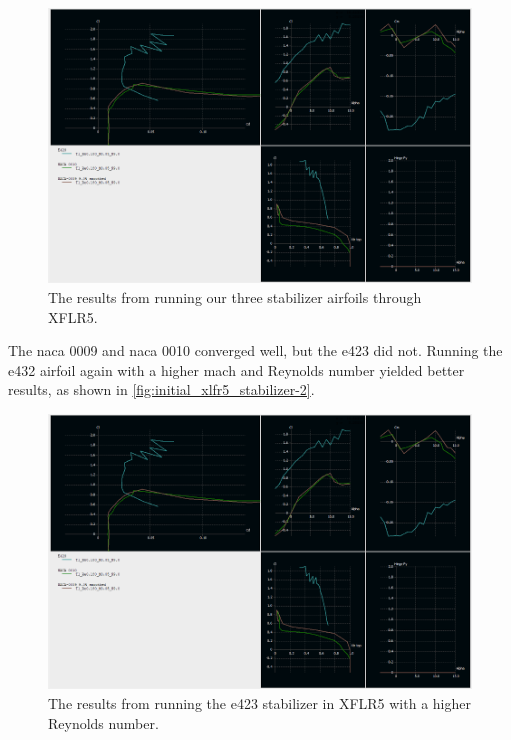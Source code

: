\begin{figure}[htpb]
    \centering
    \includegraphics[width=\linewidth]{Figures/stabilizer_initial_xlfr5-1.png}
    \caption[Initial stabilizer XLFR5 analysis results]{The results from running our three stabilizer airfoils through XFLR5.}
    \label{fig:initial_xlfr5_stabilizer-1}
\end{figure}

The \acrshort{naca} 0009 and \acrshort{naca} 0010 converged well, but the \acrshort{e}423 did not. Running the \acrshort{e}432 airfoil again with a higher mach and Reynolds number yielded better results, as shown in \autoref{fig:initial_xlfr5_stabilizer-2}.

\begin{figure}[htpb]
    \centering
    \includegraphics[width=\linewidth]{Figures/stabilizer_initial_xlfr5-1.png}
    \caption[Improved \acrshort{e}423 stabilizer XFLR5 results]{The results from running the \acrshort{e}423 stabilizer in XFLR5 with a higher Reynolds number.}
    \label{fig:initial_xlfr5_stabilizer-2}
\end{figure}

